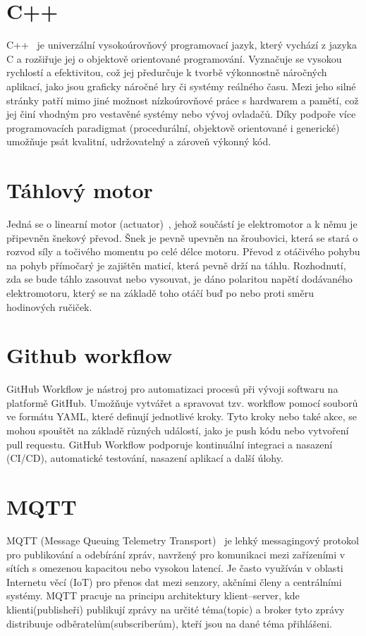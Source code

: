 \section{C++}\label{sec:cpp}
C++~\cite{cpp} je univerzální vysokoúrovňový programovací jazyk, který vychází z jazyka C a rozšiřuje jej o objektově orientované programování.
Vyznačuje se vysokou rychlostí a efektivitou, což jej předurčuje k tvorbě výkonnostně náročných aplikací, jako jsou graficky náročné hry či systémy reálného času.
Mezi jeho silné stránky patří mimo jiné možnost nízkoúrovňové práce s hardwarem a pamětí, což jej činí vhodným pro vestavěné systémy nebo vývoj ovladačů.
Díky podpoře více programovacích paradigmat (procedurální, objektově orientované i generické) umožňuje psát kvalitní, udržovatelný a zároveň výkonný kód.

\section{Táhlový motor}\label{sec:tahlovy-motor}
Jedná se o linearní motor (actuator)~\cite{tahlovymotor}, jehož součástí je elektromotor a k němu je připevněn šnekový převod.
Šnek je pevně upevněn na šroubovici, která se stará o rozvod síly a točivého momentu po celé délce motoru.
Převod z otáčivého pohybu na pohyb přímočarý je zajištěn maticí, která pevně drží na táhlu.
Rozhodnutí, zda se bude táhlo zasouvat nebo vysouvat, je dáno polaritou napětí dodávaného elektromotoru, který se na základě toho otáčí buď po nebo proti směru hodinových ručiček.

\section{Github workflow}\label{sec:github-workflow}
GitHub Workflow je nástroj pro automatizaci procesů při vývoji softwaru na platformě GitHub.
Umožňuje vytvářet a spravovat tzv. workflow pomocí souborů ve formátu YAML, které definují jednotlivé kroky.
Tyto kroky nebo také akce, se mohou spouštět na základě různých událostí, jako je push kódu nebo vytvoření pull requestu.
GitHub Workflow podporuje kontinuální integraci a nasazení (CI/CD), automatické testování, nasazení aplikací a další úlohy.

\section{MQTT}\label{sec:mqtt}
MQTT (Message Queuing Telemetry Transport)~\cite{HomeAssistantMQTT} je lehký messagingový protokol pro publikování a odebírání zpráv, navržený pro komunikaci mezi zařízeními v sítích s omezenou kapacitou nebo vysokou latencí.
Je často využíván v oblasti Internetu věcí (IoT) pro přenos dat mezi senzory, akčními členy a centrálními systémy.
MQTT pracuje na principu architektury klient–server, kde klienti(publisheři) publikují zprávy na určité téma(topic) a broker tyto zprávy distribuuje odběratelům(subscriberům), kteří jsou na dané téma přihlášeni.

